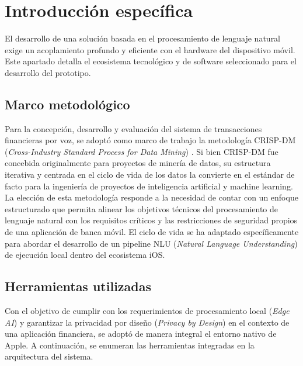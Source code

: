 \chapter{Introducción específica} %

\label{Chapter2}

El desarrollo de una solución basada en el procesamiento de lenguaje natural exige un acoplamiento profundo y eficiente con el hardware del dispositivo móvil. Este apartado detalla el ecosistema tecnológico y de software seleccionado para el desarrollo del prototipo.


\section{Marco metodológico}

Para la concepción, desarrollo y evaluación del sistema de transacciones financieras por voz, se adoptó como marco de trabajo la metodología CRISP-DM (\textit{Cross-Industry Standard Process for Data Mining}) \citep{wirth2000crisp}. Si bien CRISP-DM fue concebida originalmente para proyectos de minería de datos, su estructura iterativa y centrada en el ciclo de vida de los datos la convierte en el estándar de facto para la ingeniería de proyectos de inteligencia artificial y machine learning. La elección de esta metodología responde a la necesidad de contar con un enfoque estructurado que permita alinear los objetivos técnicos del procesamiento de lenguaje natural con los requisitos críticos y las restricciones de seguridad propios de una aplicación de banca móvil.
El ciclo de vida se ha adaptado específicamente para abordar el desarrollo de un pipeline NLU (\textit{Natural Language Understanding}) \citep{chen2019bert} de ejecución local dentro del ecosistema iOS. 


\section{Herramientas utilizadas}

Con el objetivo de cumplir con los requerimientos de procesamiento local (\textit{Edge AI}) \citep{shi2016edge} y garantizar la privacidad por diseño (\textit{Privacy by Design}) \citep{cavoukian2009privacy} en el contexto de una aplicación financiera, se adoptó de manera integral el entorno nativo de Apple. A continuación, se enumeran las herramientas integradas en la arquitectura del sistema.

